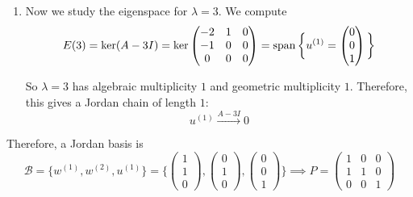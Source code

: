 \begin{example}
\begin{enumerate}
				Hence $-x + y = 1$ and $z = 0$. Taking $x = 0$, we may choose
				\begin{equation}
					w^{(2)} =
					\begin{pmatrix}
						0 \\
						1 \\
						0
					\end{pmatrix}
				\end{equation}

				Thus we have the Jordan chain
				\begin{equation}
					w^{(2)}
					\xrightarrow{A - 2I}
					w^{(1)}
					\xrightarrow{A - 2I}
					0
				\end{equation}

			\item Now we study the eigenspace for $\lambda = 3$. We compute
				\begin{equation}
					E(3) = \ker(A - 3I)
					= \ker \begin{pmatrix}
						-2 & 1 & 0 \\
						-1 & 0 & 0 \\
						0 & 0 & 0
					\end{pmatrix}
					= \operatorname{span} \bigg\{
					u^{(1)} =
					\begin{pmatrix}
						0 \\
						0 \\
						1
					\end{pmatrix}
					\bigg\}
				\end{equation}

				So $\lambda = 3$ has algebraic multiplicity $1$ and geometric multiplicity $1$. Therefore, this gives a Jordan chain of length $1$:
				\begin{equation}
					u^{(1)}
					\xrightarrow{A - 3I}
					0
				\end{equation}
		\end{enumerate}

		Therefore, a Jordan basis is
		\begin{equation}
			\mathcal{B}
			=
			\big\{
				w^{(1)}, w^{(2)}, u^{(1)}
			\big\}
			=
			\bigg\{
			\begin{pmatrix}
				1 \\
				1 \\
				0
			\end{pmatrix},
			\begin{pmatrix}
				0 \\
				1 \\
				0
			\end{pmatrix},
			\begin{pmatrix}
				0 \\
				0 \\
				1
			\end{pmatrix}
			\bigg\} \implies P = \begin{pmatrix} 1 & 0 & 0 \\ 1 & 1 & 0 \\ 0 & 0 & 1 \end{pmatrix}
		\end{equation}


\end{example}
